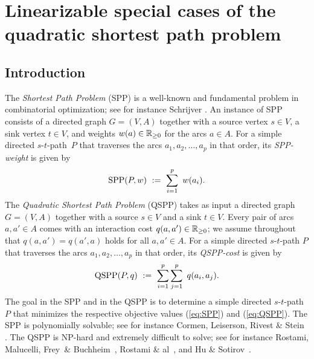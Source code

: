 \chapter{Linearizable special cases of the quadratic shortest path problem}
\label{ch:linearization-1}


\section{Introduction}
The \emph{Shortest Path Problem} (SPP) is a well-known and fundamental problem in 
combinatorial optimization; see for instance Schrijver \cite{Schrijver2012}.
An instance of SPP consists of a directed graph $G=(V,A)$ together with a source vertex $s\in V$, 
a sink vertex $t\in V$, and weights $w(a)\in{\mathbb{R}_{\ge0}}$ for the arcs $a\in A$.
For a simple directed $s$-$t$-path~$P$ that traverses the arcs $a_1,a_2,\ldots,a_p$ in that order,
its \emph{SPP-weight} is given by
\begin{equation}
\label{eq:SPP}
\text{SPP}(P,w) ~:=~ \sum_{i=1}^p~ w(a_i).
\end{equation}
The \emph{Quadratic Shortest Path Problem} (QSPP) takes as input a directed graph $G=(V,A)$ together
with a source $s\in V$ and a sink $t\in V$.
Every pair of arcs $a,a'\in A$ comes with an interaction cost $q(a,a')\in{\mathbb{R}_{\ge0}}$;
we assume throughout that $q(a,a')=q(a',a)$ holds for all $a,a'\in A$.
For a simple directed $s$-$t$-path $P$ that traverses the arcs $a_1,a_2,\ldots,a_p$ in that order,
its \emph{QSPP-cost} is given by 
\begin{equation}
\label{eq:QSPP}
\text{QSPP}(P,q) ~:=~ \sum_{i=1}^p\sum_{j=1}^p~ q(a_i,a_j).
\end{equation}
The goal in the SPP and in the QSPP is to determine a simple directed $s$-$t$-path $P$ that 
minimizes the respective objective values (\ref{eq:SPP}) and (\ref{eq:QSPP}).
The SPP is polynomially solvable; see for instance Cormen, Leiserson, Rivest \& Stein \cite{CLRS}.
The QSPP is NP-hard and extremely difficult to solve;
see for instance Rostami, Malucelli, Frey~\& Buchheim~\cite{rostami2015},
Rostami \& al~\cite{rostami2018}, and Hu \& Sotirov~\cite{huSo2018,huSo2021,huSo2020}.

